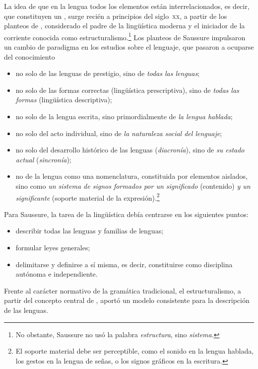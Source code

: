 La idea de que en la lengua todos los elementos están interrelacionados, es
decir, que constituyen un , surge recién a principios del
siglo~\textsc{xx}, a partir de los planteos de \textcite{saussure1945},
considerado el padre de la lingüística moderna y el iniciador de la corriente
conocida como estructuralismo.\footnote{No obstante, Saussure no usó la palabra
\textit{estructura}, sino \textit{sistema}.} Los planteos de Saussure
impulsaron un cambio de paradigma en los estudios sobre el lenguaje, que
pasaron a ocuparse del conocimiento

\begin{itemize}
  \item no solo de las lenguas de prestigio, sino de \textit{todas las lenguas};
  \item no solo de las formas correctas (lingüística prescriptiva), sino de
        \textit{todas las formas} (lingüística descriptiva);
  \item no solo de la lengua escrita, sino primordialmente de \textit{la lengua
        hablada};
  \item no solo del acto individual, sino de \textit{la naturaleza social del
        lenguaje};
  \item no solo del desarrollo histórico de las lenguas (\textit{diacronía}),
        sino de \textit{su estado actual} (\textit{sincronía});
  \item no de la lengua como una nomenclatura, constituida por elementos
        aislados, sino como \textit{un sistema de signos formados por un
        significado} (contenido) \textit{y un significante} (soporte material
        de la expresión).\footnote{El soporte material debe ser perceptible,
        como el sonido en la lengua hablada, los gestos en la lengua de señas,
        o los signos gráficos en la escritura.}
\end{itemize}

Para Saussure, la tarea de la lingüística debía centrarse en los siguientes
puntos:

\begin{itemize}
  \item describir todas las lenguas y familias de lenguas;
  \item formular leyes generales;
  \item delimitarse y definirse a sí misma, es decir, constituirse como
        disciplina autónoma e independiente.
\end{itemize}

\begin{destacado}
Frente al carácter normativo de la gramática tradicional, el estructuralismo, a
partir del concepto central de , aportó un modelo consistente
para la descripción de las lenguas.
\end{destacado}

